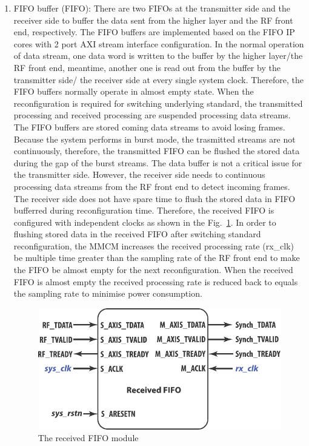 \begin{enumerate}

\item {FIFO buffer (FIFO):}
There are two FIFOs at the transmitter side and the receiver side to buffer the data sent from the higher layer and the RF front end, respectively.
The FIFO buffers are implemented based on the FIFO IP cores with 2 port AXI stream interface configuration.
In the normal operation of data stream, one data word is written to the buffer by the higher layer/the RF front end, meantime, another one is read out from the buffer by the transmitter side/ the receiver side at every single system clock.
Therefore, the FIFO buffers normally operate in almost empty state.
When the reconfiguration is required for switching underlying standard, the transmitted processing and received processing are suspended processing data streams. 
The FIFO buffers are stored coming data streams to avoid losing frames.
Because the system performs in burst mode, the trasmitted streams are not continuously, therefore, the transmitted FIFO can be flushed the stored data during the gap of the burst streams.
The data buffer is not a critical issue for the transmitter side.
However, the receiver side needs to continuous processing data streams from the RF front end to detect incoming frames. 
The receiver side does not have spare time to flush the stored data in FIFO bufferred during reconfiguration time.
Therefore, the received FIFO is configured with independent clocks as shown in the Fig.~\ref{fig:FIFO}. 
In order to flushing stored data in the received FIFO after switching standard reconfiguration, the MMCM increases the received processing rate (rx\_clk) be multiple time greater than the sampling rate of the RF front end to make the FIFO be almost empty for the next reconfiguration.
When the received FIFO is almost empty the received processing rate is reduced back to equals the sampling rate to minimise power consumption.
\begin{figure}
\centering
\includegraphics [width=0.5\columnwidth]{Figures/MSCR_RX_FIFO.pdf}
\caption{The received FIFO module}
\label{fig:FIFO}
\end{figure}


\end{enumerate}

